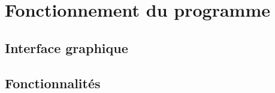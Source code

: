 \chapter{Fonctionnement du programme}
    \section{Interface graphique}
        \lipsum[1-2]


    \section{Fonctionnalités}
        \lipsum[1-2]